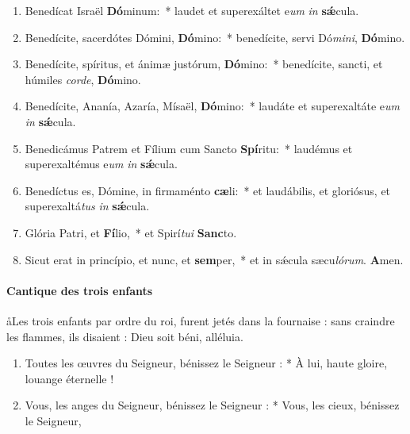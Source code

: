 \documentclass[twoside]{article}
\begin{document}
\begin{paracol}[1]{2}
\begin{enumerate}[wide, itemsep=0mm, labelwidth=!, labelindent=0pt, label=\color{gregoriocolor}\theenumi]
\item Benedícat Israël \textbf{Dó}minum:~* laudet et superexáltet e\textit{um} \textit{in} \textbf{sǽ}cula.

\item Benedícite, sacerdótes Dómini, \textbf{Dó}mino:~* benedícite, servi Dó\textit{mi}\textit{ni}, \textbf{Dó}mino.

\item Benedícite, spíritus, et ánimæ justórum, \textbf{Dó}mino:~* benedícite, sancti, et húmiles \textit{cor}\textit{de}, \textbf{Dó}mino.

\item Benedícite, Ananía, Azaría, Mísaël, \textbf{Dó}mino:~* laudáte et superexaltáte e\textit{um} \textit{in} \textbf{sǽ}cula.

\item Benedicámus Patrem et Fílium cum Sancto \textbf{Spí}ritu:~* laudémus et superexaltémus e\textit{um} \textit{in} \textbf{sǽ}cula.

\item Benedíctus es, Dómine, in firmaménto \textbf{cæ}li:~* et laudábilis, et gloriósus, et superexaltá\textit{tus} \textit{in} \textbf{sǽ}cula.

\item Glória Patri, et \textbf{Fí}lio,~* et Spirí\textit{tu}\textit{i} \textbf{Sanc}to.

\item Sicut erat in princípio, et nunc, et \textbf{sem}per,~* et in sǽcula sæcu\textit{ló}\textit{rum}. \textbf{A}men.
\end{enumerate}

\switchcolumn

\paragraph{Cantique des trois enfants}

\aa Les trois enfants par ordre du roi, furent jetés dans la fournaise : sans craindre les flammes, ils disaient : Dieu soit béni, alléluia.


\begin{enumerate}[wide, itemsep=0mm, labelwidth=!, labelindent=0pt, label=\color{gregoriocolor}\theenumi]
\item Toutes les œuvres du Seigneur,
   bénissez le Seigneur : *
À lui, haute gloire, louange éternelle !

\item Vous, les anges du Seigneur,
   bénissez le Seigneur : *
 Vous, les cieux,
   bénissez le Seigneur,
   

\end{enumerate}
\end{paracol}
\end{document}
